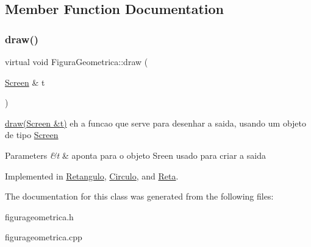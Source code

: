 \subsection{Member Function Documentation}
\mbox{\label{classFiguraGeometrica_a8ee8dedc060b6059a805ea091aef2c41}} 
\subsubsection{\texorpdfstring{draw()}{draw()}}
{\footnotesize\ttfamily virtual void Figura\+Geometrica\+::draw (\begin{DoxyParamCaption}\item[{\hyperlink{classScreen}{Screen} \&}]{t }\end{DoxyParamCaption})\hspace{0.3cm}{\ttfamily [pure virtual]}}



\hyperlink{classFiguraGeometrica_a8ee8dedc060b6059a805ea091aef2c41}{draw(\+Screen \&t)} eh a funcao que serve para desenhar a saida, usando um objeto de tipo \hyperlink{classScreen}{Screen} 


\begin{DoxyParams}{Parameters}
{\em \&t} & aponta para o objeto Sreen usado para criar a saida \\
\hline
\end{DoxyParams}


Implemented in \hyperlink{classRetangulo_ac088dd6d3f4f3d3f80363a868c2e74f1}{Retangulo}, \hyperlink{classCirculo_a593787d6e0618c2eded23e8839e7bea6}{Circulo}, and \hyperlink{classReta_ac2e9805183cd474b62bffd8b032cd780}{Reta}.



The documentation for this class was generated from the following files\+:\begin{DoxyCompactItemize}
\item 
figurageometrica.\+h\item 
figurageometrica.\+cpp\end{DoxyCompactItemize}
